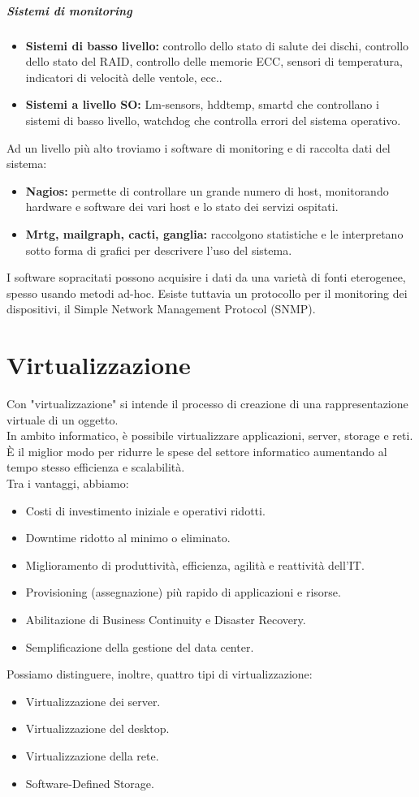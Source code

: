 \documentclass[a4paper]{report}
\begin{document}
\paragraph{Sistemi di monitoring} 
\begin{itemize}
\item \textbf{Sistemi di basso livello:} controllo dello stato di salute dei dischi, controllo dello stato del RAID, controllo delle memorie ECC, sensori di temperatura, indicatori di velocità delle ventole, ecc..
\item \textbf{Sistemi a livello SO:} Lm-sensors, hddtemp, smartd che controllano i sistemi di basso livello, watchdog che controlla errori del sistema operativo.
\end{itemize}
Ad un livello più alto troviamo i software di monitoring e di raccolta dati del sistema:
\begin{itemize}
\item \textbf{Nagios:} permette di controllare un grande numero di host, monitorando hardware e software dei vari host e lo stato dei servizi ospitati.
\item \textbf{Mrtg, mailgraph, cacti, ganglia:} raccolgono statistiche e le interpretano sotto forma di grafici per descrivere l'uso del sistema.
\end{itemize}
I software sopracitati possono acquisire i dati da una varietà di fonti eterogenee, spesso usando metodi ad-hoc. Esiste tuttavia un protocollo per il monitoring dei dispositivi, il Simple Network Management Protocol (SNMP).
\chapter{Virtualizzazione}
Con "virtualizzazione" si intende il processo di creazione di una rappresentazione virtuale di un oggetto.\\
In ambito informatico, è possibile virtualizzare applicazioni, server, storage e reti. È il miglior modo per ridurre le spese del settore informatico aumentando al tempo stesso efficienza e scalabilità.\\
Tra i vantaggi, abbiamo:
\begin{itemize}
\item Costi di investimento iniziale e operativi ridotti.
\item Downtime ridotto al minimo o eliminato.
\item Miglioramento di produttività, efficienza, agilità e
reattività dell'IT.
\item Provisioning (assegnazione) più rapido di applicazioni e risorse.
\item Abilitazione di Business Continuity e Disaster
Recovery.
\item Semplificazione della gestione del data center.
\end{itemize}
Possiamo distinguere, inoltre, quattro tipi di virtualizzazione:
\begin{itemize}
\item Virtualizzazione dei server.
\item Virtualizzazione del desktop.
\item Virtualizzazione della rete.
\item Software-Defined Storage.
\end{itemize}
\end{document}

